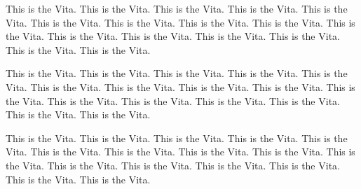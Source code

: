 \documentclass[12pt]{nuthesis}	%
\begin{document}
\begin{vita}                    %

This is the Vita. This is the Vita. This is the Vita. This is the Vita. 
This is the Vita. This is the Vita. This is the Vita. This is the Vita. 
This is the Vita. This is the Vita. This is the Vita. This is the Vita. 
This is the Vita. This is the Vita. This is the Vita. This is the Vita. 

This is the Vita. This is the Vita. This is the Vita. This is the Vita. 
This is the Vita. This is the Vita. This is the Vita. This is the Vita. 
This is the Vita. This is the Vita. This is the Vita. This is the Vita. 
This is the Vita. This is the Vita. This is the Vita. This is the Vita. 

This is the Vita. This is the Vita. This is the Vita. This is the Vita. 
This is the Vita. This is the Vita. This is the Vita. This is the Vita. 
This is the Vita. This is the Vita. This is the Vita. This is the Vita. 
This is the Vita. This is the Vita. This is the Vita. This is the Vita. 


\end{vita}
\end{document}

